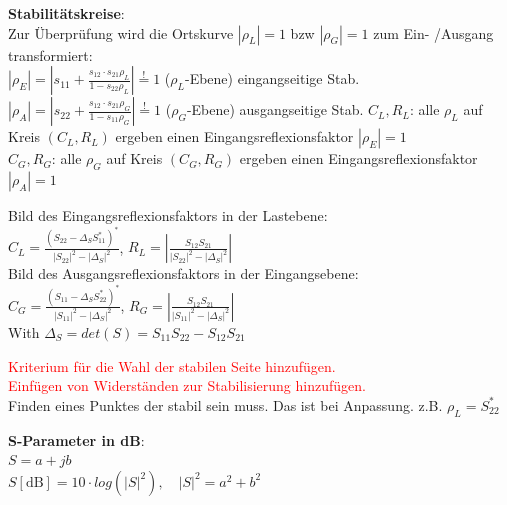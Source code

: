 \documentclass[english]{latex4ei/latex4ei_sheet}
\newcommand{\comment}[1]{\textcolor{red}{#1}}
\begin{document}
\begin{sectionbox}
	\textbf{Stabilitätskreise}:\\
	Zur Überprüfung wird die Ortskurve $\left|\rho_{L}\right|=1$ bzw $\left|\rho_{G}\right|=1$ zum Ein- /Ausgang transformiert:\\
	$\left|\rho_{E}\right|=\left|s_{11}+\frac{s_{12} \cdot s_{21} \rho_{L}}{1-s_{22} \rho_{L}}\right| \stackrel{!}{=} 1$ ($\rho_L$-Ebene) eingangseitige Stab.\\
	$\left|\rho_{A}\right|=\left|s_{22}+\frac{s_{12} \cdot s_{21} \rho_{G}}{1-s_{11} \rho_{G}}\right| \stackrel{!}{=} 1$ ($\rho_G$-Ebene) ausgangseitige Stab.
	$C_L, R_L$: alle $\rho_L$ auf Kreis $(C_L, R_L)$ ergeben einen Eingangsreflexionsfaktor $|\rho_E| = 1$\\
	$C_G, R_G$: alle $\rho_G$ auf Kreis $(C_G, R_G)$ ergeben einen Eingangsreflexionsfaktor $|\rho_A| = 1$
	\begin{emphbox}
		Bild des Eingangsreflexionsfaktors in der Lastebene:\\
		$C_{L}=\frac{\left(S_{22}-\Delta_{S} S_{11}^{*}\right)^{*}}{\left|S_{22}\right|^{2}-\left|\Delta_{S}\right|^{2}}$, 
		$R_{L}=\left|\frac{S_{12} S_{21}}{\left|S_{22}\right|^{2}-\left|\Delta_{S}\right|^{2}}\right|$\\
		Bild des Ausgangsreflexionsfaktors in der Eingangsebene:\\
		$C_{G}=\frac{\left(S_{11}-\Delta_{S} S_{22}^{*}\right)^{*}}{\left|S_{11}\right|^{2}-\left|\Delta_{S}\right|^{2}}$, $R_{G}=\left|\frac{S_{12} S_{21}}{\left|S_{11}\right|^{2}-\left|\Delta_{S}\right|^{2}}\right|$\\
		\vspace{1em}
		With $\Delta_{S} = det(S) = S_{11}S_{22}-S_{12}S_{21}$
	\end{emphbox}
	\comment{Kriterium für die Wahl der stabilen Seite hinzufügen.}\\
	\comment{Einfügen von Widerständen zur Stabilisierung hinzufügen.}\\ 
	Finden eines Punktes der stabil sein muss. Das ist bei Anpassung. z.B. $\rho_L=S^*_{22}$
\end{sectionbox}
\begin{sectionbox}
\begin{emphbox}
\begin{flushleft}
\textbf{S-Parameter in dB}:\\
$S = a + jb$\\
$S [\text{dB}] = 10\cdot log(|S|^2), \quad |S|^2 = a^2+b^2$
\end{flushleft}
\end{emphbox}
\end{sectionbox}
\end{document}
